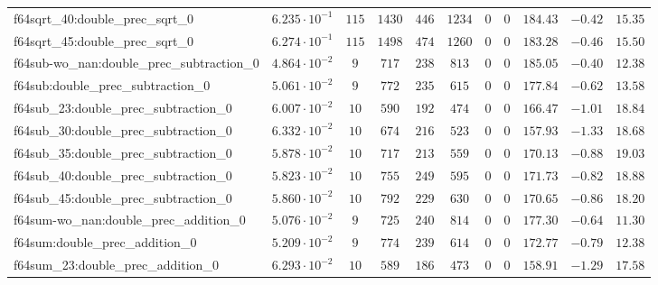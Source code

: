 \begin{tabular}{|l|c|c|c|c|c|c|c|c|c|c|}
f64sqrt\_40:double\_prec\_sqrt\_0              & $ 6.235 \cdot 10^{-1} $ & $ 115    $ & $ 1430   $ & $ 446   $ & $ 1234   $ & $ 0   $ & $ 0 $ & $ 184.43      $ & $ -0.42   $ & $ 15.35   $ \\
f64sqrt\_45:double\_prec\_sqrt\_0              & $ 6.274 \cdot 10^{-1} $ & $ 115    $ & $ 1498   $ & $ 474   $ & $ 1260   $ & $ 0   $ & $ 0 $ & $ 183.28      $ & $ -0.46   $ & $ 15.50   $ \\
f64sub-wo\_nan:double\_prec\_subtraction\_0    & $ 4.864 \cdot 10^{-2} $ & $ 9      $ & $ 717    $ & $ 238   $ & $ 813    $ & $ 0   $ & $ 0 $ & $ 185.05      $ & $ -0.40   $ & $ 12.38   $ \\
f64sub:double\_prec\_subtraction\_0            & $ 5.061 \cdot 10^{-2} $ & $ 9      $ & $ 772    $ & $ 235   $ & $ 615    $ & $ 0   $ & $ 0 $ & $ 177.84      $ & $ -0.62   $ & $ 13.58   $ \\
f64sub\_23:double\_prec\_subtraction\_0        & $ 6.007 \cdot 10^{-2} $ & $ 10     $ & $ 590    $ & $ 192   $ & $ 474    $ & $ 0   $ & $ 0 $ & $ 166.47      $ & $ -1.01   $ & $ 18.84   $ \\
f64sub\_30:double\_prec\_subtraction\_0        & $ 6.332 \cdot 10^{-2} $ & $ 10     $ & $ 674    $ & $ 216   $ & $ 523    $ & $ 0   $ & $ 0 $ & $ 157.93      $ & $ -1.33   $ & $ 18.68   $ \\
f64sub\_35:double\_prec\_subtraction\_0        & $ 5.878 \cdot 10^{-2} $ & $ 10     $ & $ 717    $ & $ 213   $ & $ 559    $ & $ 0   $ & $ 0 $ & $ 170.13      $ & $ -0.88   $ & $ 19.03   $ \\
f64sub\_40:double\_prec\_subtraction\_0        & $ 5.823 \cdot 10^{-2} $ & $ 10     $ & $ 755    $ & $ 249   $ & $ 595    $ & $ 0   $ & $ 0 $ & $ 171.73      $ & $ -0.82   $ & $ 18.88   $ \\
f64sub\_45:double\_prec\_subtraction\_0        & $ 5.860 \cdot 10^{-2} $ & $ 10     $ & $ 792    $ & $ 229   $ & $ 630    $ & $ 0   $ & $ 0 $ & $ 170.65      $ & $ -0.86   $ & $ 18.20   $ \\
f64sum-wo\_nan:double\_prec\_addition\_0       & $ 5.076 \cdot 10^{-2} $ & $ 9      $ & $ 725    $ & $ 240   $ & $ 814    $ & $ 0   $ & $ 0 $ & $ 177.30      $ & $ -0.64   $ & $ 11.30   $ \\
f64sum:double\_prec\_addition\_0               & $ 5.209 \cdot 10^{-2} $ & $ 9      $ & $ 774    $ & $ 239   $ & $ 614    $ & $ 0   $ & $ 0 $ & $ 172.77      $ & $ -0.79   $ & $ 12.38   $ \\
f64sum\_23:double\_prec\_addition\_0           & $ 6.293 \cdot 10^{-2} $ & $ 10     $ & $ 589    $ & $ 186   $ & $ 473    $ & $ 0   $ & $ 0 $ & $ 158.91      $ & $ -1.29   $ & $ 17.58   $ \\

\end{tabular}

